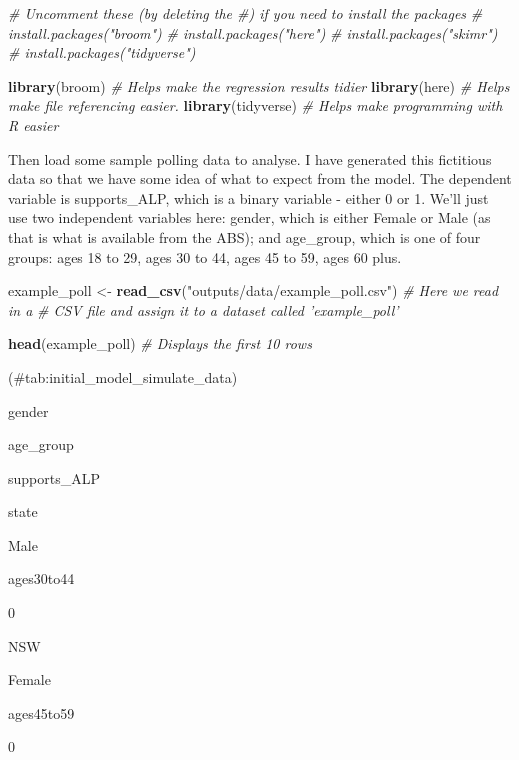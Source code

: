 \documentclass[
]{book}
\newenvironment{Shaded}{\begin{snugshade}}{\end{snugshade}}
\newcommand{\CommentTok}[1]{\textcolor[rgb]{0.56,0.35,0.01}{\textit{#1}}}
\newcommand{\KeywordTok}[1]{\textcolor[rgb]{0.13,0.29,0.53}{\textbf{#1}}}
\newcommand{\NormalTok}[1]{#1}
\newcommand{\StringTok}[1]{\textcolor[rgb]{0.31,0.60,0.02}{#1}}
\begin{document}
\begin{Shaded}
\begin{Highlighting}[]
\CommentTok{# Uncomment these (by deleting the #) if you need to install the packages}
\CommentTok{# install.packages("broom")}
\CommentTok{# install.packages("here")}
\CommentTok{# install.packages("skimr")}
\CommentTok{# install.packages("tidyverse")}

\KeywordTok{library}\NormalTok{(broom) }\CommentTok{# Helps make the regression results tidier}
\KeywordTok{library}\NormalTok{(here) }\CommentTok{# Helps make file referencing easier.}
\KeywordTok{library}\NormalTok{(tidyverse) }\CommentTok{# Helps make programming with R easier}
\end{Highlighting}
\end{Shaded}

Then load some sample polling data to analyse. I have generated this fictitious data so that we have some idea of what to expect from the model. The dependent variable is supports\_ALP, which is a binary variable - either 0 or 1. We'll just use two independent variables here: gender, which is either Female or Male (as that is what is available from the ABS); and age\_group, which is one of four groups: ages 18 to 29, ages 30 to 44, ages 45 to 59, ages 60 plus.

\begin{Shaded}
\begin{Highlighting}[]
\NormalTok{example_poll <-}\StringTok{ }\KeywordTok{read_csv}\NormalTok{(}\StringTok{"outputs/data/example_poll.csv"}\NormalTok{) }\CommentTok{# Here we read in a }
\CommentTok{# CSV file and assign it to a dataset called 'example_poll'}

\KeywordTok{head}\NormalTok{(example_poll) }\CommentTok{# Displays the first 10 rows}
\end{Highlighting}
\end{Shaded}

(\#tab:initial\_model\_simulate\_data)

gender

age\_group

supports\_ALP

state

Male

ages30to44

0

NSW

Female

ages45to59

0
\end{document}
